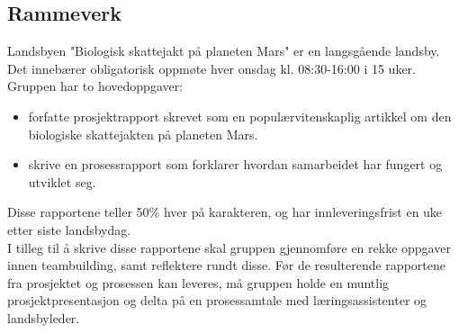 \subsection{Rammeverk}

Landsbyen "Biologisk skattejakt på planeten Mars" er en langsgående landsby.
Det innebærer obligatorisk oppmøte hver onsdag kl. 08:30-16:00 i 15 uker.
\\
Gruppen har to hovedoppgaver:
\begin{itemize}
\item forfatte prosjektrapport skrevet som en populærvitenskaplig artikkel om den biologiske skattejakten på planeten Mars.
\item skrive en prosessrapport som forklarer hvordan samarbeidet har fungert og utviklet seg.
\end{itemize}
Disse rapportene teller 50\% hver på karakteren, og har innleveringsfrist en uke etter siste landsbydag.
\\
I tilleg til å skrive disse rapportene skal gruppen gjennomføre en rekke oppgaver innen teambuilding, samt reflektere rundt disse.
Før de resulterende rapportene fra prosjektet og prosessen kan leveres, må gruppen holde en muntlig prosjektpresentasjon og delta på en prosessamtale med læringsassistenter og landsbyleder. 
\\